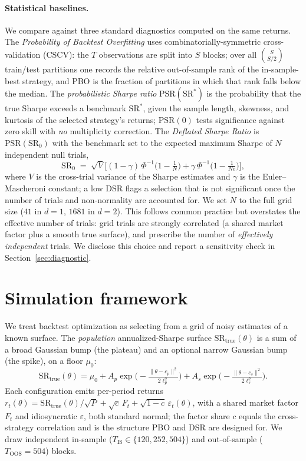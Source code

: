 \documentclass[11pt]{article}
\newcommand{\sr}{\mathrm{SR}}
\newcommand{\theyll}{\theta}
\begin{document}
\paragraph{Statistical baselines.} We compare against three standard
diagnostics computed on the same returns. The \emph{Probability of Backtest
Overfitting} \citep{bailey2017pbo} uses combinatorially-symmetric
cross-validation (CSCV): the $T$ observations are split into $S$ blocks; over
all $\binom{S}{S/2}$ train/test partitions one records the relative
out-of-sample rank of the in-sample-best strategy, and PBO is the fraction of
partitions in which that rank falls below the median. The \emph{probabilistic
Sharpe ratio} \citep{bailey2012psr} $\mathrm{PSR}(\sr^{*})$ is the probability
that the true Sharpe exceeds a benchmark $\sr^{*}$, given the sample length,
skewness, and kurtosis of the selected strategy's returns; $\mathrm{PSR}(0)$
tests significance against zero skill with \emph{no} multiplicity correction.
The \emph{Deflated Sharpe Ratio} \citep{bailey2014dsr} is
$\mathrm{PSR}(\sr_0)$ with the benchmark set to the expected maximum Sharpe of
$N$ independent null trials,
\begin{equation}
\sr_0 \;=\; \sqrt{V}\Big[(1-\gamma)\,\Phi^{-1}\!\big(1-\tfrac1N\big) + \gamma\,\Phi^{-1}\!\big(1-\tfrac1{Ne}\big)\Big],
\end{equation}
where $V$ is the cross-trial variance of the Sharpe estimates and $\gamma$ is the
Euler--Mascheroni constant; a low DSR flags a selection that is not significant
once the number of trials and non-normality are accounted for. We set $N$ to
the full grid size ($41$ in $d{=}1$, $1681$ in $d{=}2$). This follows common
practice but overstates the effective number of trials: grid trials are strongly
correlated (a shared market factor plus a smooth true surface), and
\citet{bailey2014dsr} prescribe the number of \emph{effectively independent}
trials. We disclose this choice and report a sensitivity check in
Section~\ref{sec:diagnostic}.

\section{Simulation framework}
\label{sec:framework}

We treat backtest optimization as selecting from a grid of noisy estimates of a
known surface. The \emph{population} annualized-Sharpe surface
$\sr_{\text{true}}(\theyll)$ is a sum of a broad Gaussian bump (the plateau) and
an optional narrow Gaussian bump (the spike), on a floor $\mu_0$:
\begin{equation}
\sr_{\text{true}}(\theyll) = \mu_0 + A_p \exp\!\Big(\!-\tfrac{\|\theyll-c_p\|^2}{2\ell_p^2}\Big)
+ A_s \exp\!\Big(\!-\tfrac{\|\theyll-c_s\|^2}{2\ell_s^2}\Big).
\end{equation}
Each configuration emits per-period returns
$r_t(\theyll) = \sr_{\text{true}}(\theyll)/\sqrt{P} + \sqrt{c}\,F_t + \sqrt{1-c}\,\varepsilon_t(\theyll)$,
with a shared market factor $F_t$ and idiosyncratic $\varepsilon$, both standard
normal; the factor share $c$ equals the cross-strategy correlation and is the
structure PBO and DSR are designed for. We draw independent in-sample
($T_{\text{IS}}\in\{120,252,504\}$) and out-of-sample ($T_{\text{OOS}}=504$)
blocks.
\end{document}
